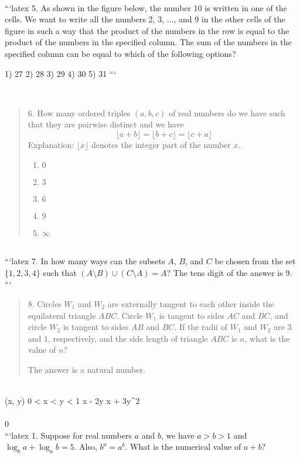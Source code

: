 \\
```latex
5. As shown in the figure below, the number 10 is written in one of the cells. We want to write all the numbers 2, 3, ..., and 9 in the other cells of the figure in such a way that the product of the numbers in the row is equal to the product of the numbers in the specified column. The sum of the numbers in the specified column can be equal to which of the following options?

1) 27  
2) 28  
3) 29  
4) 30  
5) 31  
```

\\
\begin{quote}
6. How many ordered triples $(a, b, c)$ of real numbers do we have such that they are pairwise distinct and we have 
\[
\lfloor a + b \rfloor = \lfloor b + c \rfloor = \lfloor c + a \rfloor
\]
Explanation: $\lfloor x \rfloor$ denotes the integer part of the number $x$.
\begin{enumerate}
    \item $0$
    \item $3$
    \item $6$
    \item $9$
    \item $\infty$
\end{enumerate}
\end{quote}
\\
```latex
7. In how many ways can the subsets $A$, $B$, and $C$ be chosen from the set $\{1, 2, 3, 4\}$ such that $(A \setminus B) \cup (C \setminus A) = A$? The tens digit of the answer is 9.
```
\\
\begin{quote}
8. Circles $W_1$ and $W_2$ are externally tangent to each other inside the equilateral triangle $ABC$. Circle $W_1$ is tangent to sides $AC$ and $BC$, and circle $W_2$ is tangent to sides $AB$ and $BC$. If the radii of $W_1$ and $W_2$ are $3$ and $1$, respectively, and the side length of triangle $ABC$ is $n$, what is the value of $n$?

The answer is a natural number.
\end{quote}
\\
 (x, y)  0 < x < y < 1  x - 2y  x + 3y^2  \\
 \\
0
\\
```latex
1. Suppose for real numbers $a$ and $b$, we have $a > b > 1$ and $\log_b a + \log_a b = 5$. Also, $b^a = a^b$. What is the numerical value of $a + b$?

